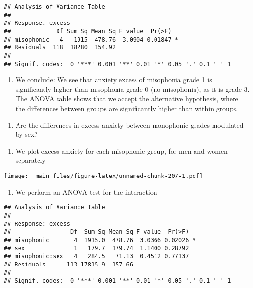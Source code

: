 \documentclass[
]{book}
\providecommand{\tightlist}{%
  \setlength{\itemsep}{0pt}\setlength{\parskip}{0pt}}
\begin{document}
\begin{verbatim}
## Analysis of Variance Table
## 
## Response: excess
##             Df Sum Sq Mean Sq F value  Pr(>F)  
## misophonic   4   1915  478.76  3.0904 0.01847 *
## Residuals  118  18280  154.92                  
## ---
## Signif. codes:  0 '***' 0.001 '**' 0.01 '*' 0.05 '.' 0.1 ' ' 1
\end{verbatim}

\begin{enumerate}
\def\labelenumi{\alph{enumi}.}
\setcounter{enumi}{2}
\tightlist
\item
  We conclude: We see that anxiety excess of misophonia grade 1 is significantly higher than misophonia grade 0 (no misophonia), as it is grade 3. The ANOVA table shows that we accept the alternative hypothesis, where the differences between groups are significantly higher than within groups.
\end{enumerate}

\begin{enumerate}
\def\labelenumi{\arabic{enumi}.}
\setcounter{enumi}{5}
\tightlist
\item
  Are the differences in excess anxiety between monophonic grades modulated by sex?
\end{enumerate}

\begin{enumerate}
\def\labelenumi{\alph{enumi}.}
\tightlist
\item
  We plot excess anxiety for each misophonic group, for men and women separately
\end{enumerate}

\texttt{[image: \_main\_files/figure-latex/unnamed-chunk-207-1.pdf]}

\begin{enumerate}
\def\labelenumi{\alph{enumi}.}
\setcounter{enumi}{1}
\tightlist
\item
  We perform an ANOVA test for the interaction
\end{enumerate}

\begin{verbatim}
## Analysis of Variance Table
## 
## Response: excess
##                 Df  Sum Sq Mean Sq F value  Pr(>F)  
## misophonic       4  1915.0  478.76  3.0366 0.02026 *
## sex              1   179.7  179.74  1.1400 0.28792  
## misophonic:sex   4   284.5   71.13  0.4512 0.77137  
## Residuals      113 17815.9  157.66                  
## ---
## Signif. codes:  0 '***' 0.001 '**' 0.01 '*' 0.05 '.' 0.1 ' ' 1
\end{verbatim}
\end{document}
